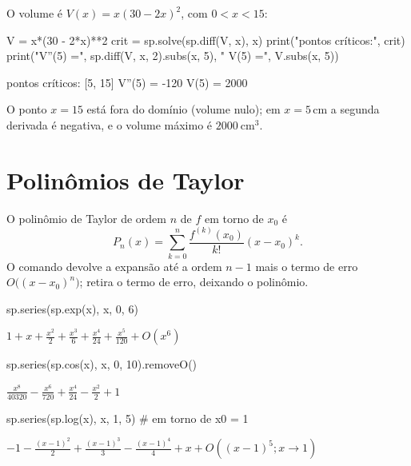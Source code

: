 O volume é $V(x)=x(30-2x)^2$, com $0<x<15$:

\begin{entrada}
V = x*(30 - 2*x)**2
crit = sp.solve(sp.diff(V, x), x)
print("pontos críticos:", crit)
print("V''(5) =", sp.diff(V, x, 2).subs(x, 5), "  V(5) =", V.subs(x, 5))
\end{entrada}
\begin{saida}
pontos críticos: [5, 15]
V''(5) = -120   V(5) = 2000
\end{saida}

O ponto $x=15$ está fora do domínio (volume nulo); em $x=5$\,cm a segunda derivada é negativa, e o volume máximo é
$2000\ \text{cm}^3$.

\section{Polinômios de Taylor}

O polinômio de Taylor de ordem $n$ de $f$ em torno de $x_0$ é
\[
P_n(x)=\sum_{k=0}^{n}\frac{f^{(k)}(x_0)}{k!}(x-x_0)^k .
\]
O comando  devolve a expansão até a ordem $n-1$ mais o termo de erro
$O\big((x-x_0)^n\big)$;  retira o termo de erro, deixando o polinômio.

\begin{entrada}
sp.series(sp.exp(x), x, 0, 6)
\end{entrada}
\begin{saidamat}
$\displaystyle 1 + x + \frac{x^{2}}{2} + \frac{x^{3}}{6} + \frac{x^{4}}{24} + \frac{x^{5}}{120} + O\left(x^{6}\right)$
\end{saidamat}

\begin{entrada}
sp.series(sp.cos(x), x, 0, 10).removeO()
\end{entrada}
\begin{saidamat}
$\displaystyle \frac{x^{8}}{40320} - \frac{x^{6}}{720} + \frac{x^{4}}{24} - \frac{x^{2}}{2} + 1$
\end{saidamat}

\begin{entrada}
sp.series(sp.log(x), x, 1, 5)          # em torno de x0 = 1
\end{entrada}
\begin{saidamat}
$\displaystyle -1 - \frac{\left(x - 1\right)^{2}}{2} + \frac{\left(x - 1\right)^{3}}{3} - \frac{\left(x - 1\right)^{4}}{4} + x + O\left(\left(x - 1\right)^{5}; x\rightarrow 1\right)$
\end{saidamat}

